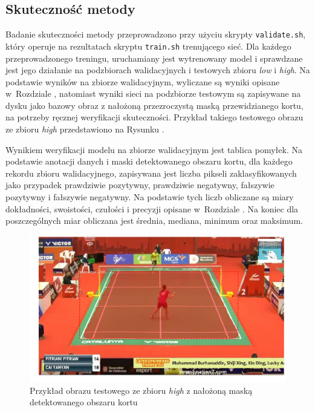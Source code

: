 \subsection*{Skuteczność metody}

Badanie skuteczności metody przeprowadzono przy użyciu skrypty \texttt{validate.sh}, który operuje na rezultatach skryptu \texttt{train.sh} trenującego sieć.
Dla każdego przeprowadzonego treningu, uruchamiany jest wytrenowany model i sprawdzane jest jego działanie na podzbiorach walidacyjnych i testowych zbioru \textit{low} i \textit{high}. Na podstawie wyników na zbiorze walidacyjnym, wyliczane są wyniki opisane w~Rozdziale , natomiast wyniki sieci na podzbiorze testowym są zapisywane na dysku jako bazowy obraz z nałożoną przezroczystą maską przewidzianego kortu, na potrzeby ręcznej weryfikacji skuteczności. Przykład takiego testowego obrazu
ze zbioru \textit{high} przedstawiono na Rysunku .


Wynikiem weryfikacji modelu na zbiorze walidacyjnym jest tablica pomyłek. Na podstawie anotacji danych i maski detektowanego obszaru kortu, dla każdego rekordu zbioru walidacyjnego, zapisywana jest liczba pikseli zaklasyfikowanych jako przypadek prawdziwie pozytywny, prawdziwie negatywny, fałszywie pozytywny i fałszywie negatywny. Na podstawie tych liczb obliczane są miary dokładności, swoistości, czułości i precyzji opisane w~Rozdziale . Na koniec dla poszczególnych miar obliczana jest średnia, mediana, minimum oraz maksimum.

\begin{figure}[!htb]
  \includegraphics[width=\linewidth]{./ss2.jpg}
    \caption{Przykład obrazu testowego ze zbioru \textit{high} z nałożoną maską detektowanego obszaru kortu}
    \label{fig:testexample}
\end{figure}
